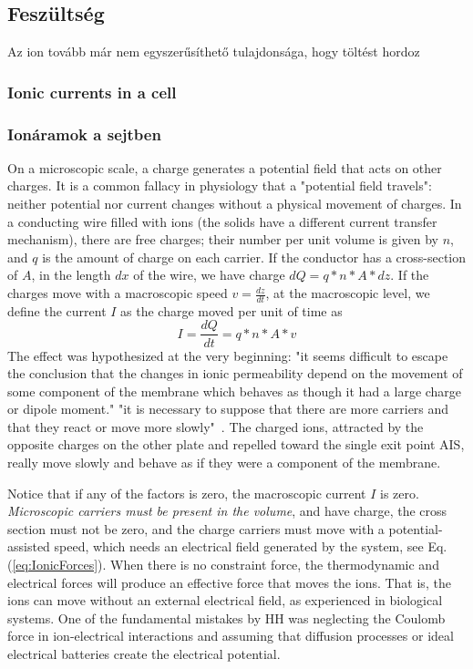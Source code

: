 \else

\subsection[Áram]{Feszültség\label{sec:Electricity-Current}}

Az ion tovább már nem egyszerűsíthető tulajdonsága, hogy
töltést hordoz
\fi

\ifx\magyar\undefined
\subsubsection{Ionic currents in a cell\label{sec:Electricity-IonicCurrent}}
\else
\subsubsection{Ionáramok a sejtben\label{sec:Electricity-IonicCurrent}}
\fi

\ifx\magyar\undefined
On a microscopic scale, a charge generates a potential field that acts on other charges. It is a common fallacy in physiology that a "potential field travels": neither potential nor current changes without a physical movement of charges. In a conducting wire filled with ions (the solids have a different current transfer mechanism), there are free charges; their
number per unit volume is given by $n$, and $q$ is the amount of
charge on each carrier. If the conductor has a cross-section of $A$,
in the length $dx$ of the wire, we have charge $dQ=q*n*A*dz$. If the charges move with a macroscopic speed $v=\frac{dz}{dt}$, 
at the macroscopic level, we define the current $I$ as the charge moved per unit of time as
\begin{equation}
	I=\frac{dQ}{dt}=q*n*A*v\label{eq:DriftCurrent}
\end{equation}
The effect was hypothesized at the very beginning: "it seems difficult to escape the conclusion that the changes
in ionic permeability depend on the movement of some component of the
membrane which behaves as though it had a large charge or dipole moment."
"it is necessary to suppose
that there are more carriers and that they react or move more slowly"~\cite{HodgkinHuxley:1952}. The charged ions, attracted by the opposite charges on the other plate and repelled toward the single exit point \gls{AIS}, really move slowly and behave as if they were a component of the membrane.
\else

\fi

\ifx\magyar\undefined
Notice that if any of the factors is zero, the macroscopic current
$I$ is zero. \textit{Microscopic carriers must be present in the volume},
and have charge, the cross section must not be zero, and the charge
carriers must move with a potential-assisted speed, which needs an
electrical field generated by the system, see Eq.(\ref{eq:IonicForces}).
When there is no constraint force, the thermodynamic and electrical forces will produce an effective force that moves the ions.
That is, the ions can move without an external electrical field, as experienced
in biological systems. 
One of the fundamental mistakes by \gls{HH} was neglecting the Coulomb force in ion-electrical interactions and assuming that diffusion processes or ideal electrical batteries create the electrical potential.
\else

